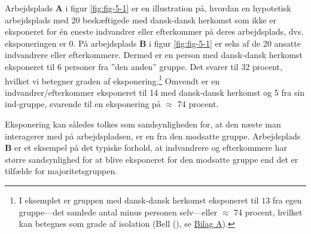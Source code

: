 \documentclass[
]{book}
\begin{document}
Arbejdsplads \textbf{A} i figur \ref{fig:fig-5-1} er en illustration på, hvordan en hypotetisk arbejdsplads med 20 beskæftigede med dansk-dansk herkomst som ikke er eksponeret for én eneste indvandrer eller efterkommer på deres arbejdsplads, dvs. eksponeringen er \(0\). På arbejdsplads \textbf{B} i figur \ref{fig:fig-5-1} er seks af de 20 ansatte indvandrere eller efterkommere. Dermed er en person med dansk-dansk herkomst eksponeret til 6 personer fra ''den anden'' gruppe. Det svarer til 32 procent, hvilket vi betegner graden af eksponering.\footnote{I eksemplet er gruppen med dansk-dansk herkomst eksponeret til \(13\) fra egen gruppe---det samlede antal minus personen selv---eller \(\approx\) 74 procent, hvilket kan betegnes som grade af isolation (Bell (), se \hyperref[bilagA]{Bilag A}).} Omvendt er en indvandrer/efterkommer eksponeret til 14 med dansk-dansk herkomst og 5 fra sin ind-gruppe, svarende til en eksponering på \(\approx\) 74 procent.

Eksponering kan således tolkes som sandsynligheden for, at den næste man interagerer med på arbejdspladsen, er en fra den modsatte gruppe. Arbejdsplads \textbf{B} er et eksempel på det typiske forhold, at indvandrere og efterkommere har større sandsynlighed for at blive eksponeret for den modsatte gruppe end det er tilfælde for majoritetsgruppen.
\end{document}
